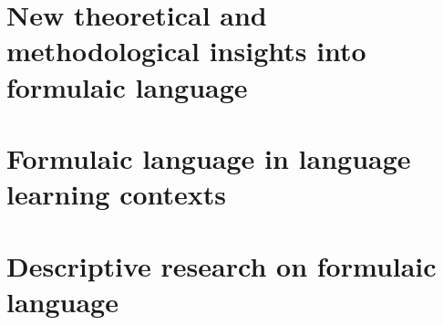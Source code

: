 \documentclass[output=book,collection,multiauthors
            ,colorlinks, citecolor=brown
		  ]{langscibook}
\begin{document}
\maketitle
\frontmatter

{\sloppy\tableofcontents}

% 
% 


\mainmatter


\part{New theoretical and methodological insights into formulaic language}
\part{Formulaic language in language learning contexts}
\part{Descriptive research on formulaic language}


\end{document}
